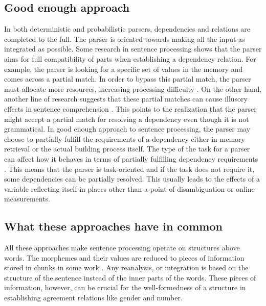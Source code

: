 \subsection{Good enough approach}

In both deterministic and probabilistic parsers, dependencies and relations are completed to the full. The parser is oriented towards making all the input as integrated as possible. Some research in sentence processing shows that the parser aims for full compatibility of parts when establishing a dependency relation. For example, the parser is looking for a specific set of values in the memory and comes across a partial match. In order to bypass this partial match, the parser must allocate more resources, increasing processing difficulty \citep{van2012memory,VanDyke2006}. On the other hand, another line of research suggests that these partial matches can cause illusory effects in sentence comprehension \citep{Parker2016,mendia2018spurious,wagers2009agreement}. This points to the realization that the parser might accept a partial match for resolving a dependency even though it is not grammatical. In good enough approach to sentence processing, the parser may choose to partially fulfill the requirements of a dependency \citep{ferreira2001misinterpretations,ferreira2007good} either in memory retrieval or the actual building process itself. The type of the task for a parser can affect how it behaves in terms of partially fulfilling dependency requirements \citep{Swets2008,logavcev2016multiple}. This means that the parser is task-oriented and if the task does not require it, some dependencies can be partially resolved. This usually leads to the effects of a variable reflecting itself in places other than a point of disambiguation or online measurements.


\subsection{What these approaches have in common}

All these approaches make sentence processing operate on structures above words. The morphemes and their values are reduced to pieces of information stored in chunks in some work \citep{lewis2005activation}. Any reanalysis, or integration is based on the structure of the sentence instead of the inner parts of the words. These pieces of information, however, can be crucial for the well-formedness of a structure in establishing agreement relations like gender and number.